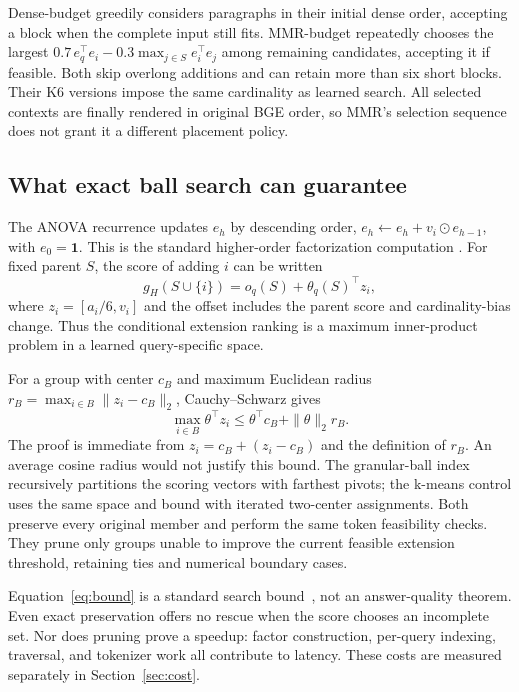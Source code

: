 \documentclass[pdflatex,sn-mathphys-num]{sn-jnl}
\begin{document}
Dense-budget greedily considers paragraphs in their initial dense order,
accepting a block when the complete input still fits. MMR-budget repeatedly
chooses the largest $0.7\,e_q^\top e_i-0.3\max_{j\in S}e_i^\top e_j$ among
remaining candidates, accepting it if feasible. Both skip overlong additions
and can retain more than six short blocks. Their K6 versions impose the
same cardinality as learned search. All selected contexts are finally
rendered in original BGE order, so MMR's selection sequence does not grant
it a different placement policy.

\subsection{What exact ball search can guarantee}
The ANOVA recurrence updates $e_h$ by descending order,
$e_h\leftarrow e_h+v_i\odot e_{h-1}$, with $e_0=\mathbf1$.
This is the standard higher-order factorization computation
\cite{blondel2016hofm}. For fixed parent $S$, the score of adding $i$ can be
written
\begin{equation}
g_H(S\cup\{i\})=o_q(S)+\theta_q(S)^\top z_i,
\end{equation}
where $z_i=[a_i/6,v_i]$ and the offset includes the parent score and
cardinality-bias change. Thus the conditional extension ranking is a maximum
inner-product problem in a learned query-specific space.

For a group with center $c_B$ and maximum Euclidean radius
$r_B=\max_{i\in B}\|z_i-c_B\|_2$, Cauchy--Schwarz gives
\begin{equation}\label{eq:bound}
\max_{i\in B}\theta^\top z_i\leq\theta^\top c_B+\|\theta\|_2r_B.
\end{equation}
The proof is immediate from $z_i=c_B+(z_i-c_B)$ and the definition of
$r_B$. An average cosine radius would not justify this bound. The
granular-ball index recursively partitions the scoring vectors with
farthest pivots; the k-means control uses the same space and bound with
iterated two-center assignments. Both preserve every original member and
perform the same token feasibility checks. They prune only groups unable
to improve the current feasible extension threshold, retaining ties and
numerical boundary cases.

Equation~\ref{eq:bound} is a standard search bound~\cite{ram2012tree}, not an
answer-quality theorem. Even exact preservation offers no rescue when the
score chooses an incomplete set. Nor does pruning prove a speedup: factor
construction, per-query indexing, traversal, and tokenizer work all contribute
to latency. These costs are measured separately in Section~\ref{sec:cost}.
\end{document}
